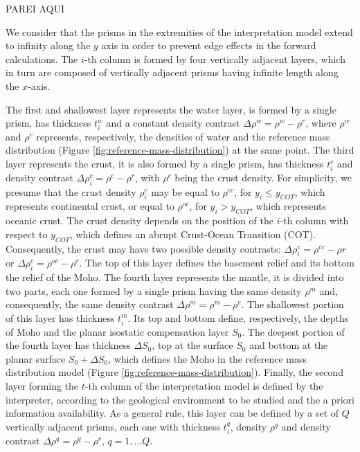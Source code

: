 \documentclass[manuscript]{geophysics}
\begin{document}
PAREI AQUI

We consider that the prisms in the 
extremities of the interpretation model extend to infinity along the $y$ axis 
in order to prevent edge effects in the forward calculations. 
The $i$-th column is formed by four vertically adjacent 
layers, which in turn are composed of vertically adjacent prisms having infinite 
length along the $x$-axis. 

The first and shallowest layer represents the water layer, 
is formed by a single prism, has thickness $t^{w}_{i}$ and a constant density contrast 
$\Delta \rho^{w} = \rho^{w} - \rho^{r}$, where $\rho^{w}$ and $\rho^{r}$ 
represents, respectively, the densities of water and the reference mass 
distribution (Figure \ref{fig:reference-mass-distribution}) at the same point.
The third layer represents the crust, it is also formed by a single prism,
has thickness $t^{c}_{i}$ and density contrast 
$\Delta \rho^{c}_{i} = \rho^{c} - \rho^{r}$, 
with $\rho^{c}$ being the crust density. For simplicity, we presume that the crust
density $\rho^{c}_{i}$ may be equal to $\rho^{cc}$, for $y_{i} \le y_{COT}$, which
represents continental crust,
or equal to $\rho^{oc}$, for $y_{i} > y_{COT}$, which represents oceanic crust.
The crust density depends on the position of the $i$-th column with respect to
$y_{COT}$, which defines an abrupt Crust-Ocean Transition (COT). Consequently, the
crust may have two possible density contrasts: 
$\Delta \rho^{c}_{i} = \rho^{cc} - \rho{r}$ or 
$\Delta \rho^{c}_{i} = \rho^{oc} - \rho^{r}$. The top of this layer defines the 
basement relief and its bottom the relief of the Moho. The fourth layer represents the
mantle, it is divided into two parts, each one formed by a single prism having the same
density $\rho^{m}$ and, consequently, the same density contrast 
$\Delta \rho^{m} = \rho^{m} - \rho^{r}$. The shallowest
portion of this layer has thickness $t^{m}_{i}$. Its top and bottom define,
respectively, the depths of Moho and the planar isostatic compensation layer $S_{0}$.
The deepest portion of the fourth layer has thickness $\Delta S_{0}$, top at the
surface $S_{0}$ and bottom at the planar surface 
$S_{0} + \Delta S_{0}$, which defines the Moho in the reference mass distribution model 
(Figure \ref{fig:reference-mass-distribution}). Finally, the second layer forming the
$t$-th column of the interpretation model is defined by the interpreter, according to
the geological environment to be studied and the a priori information availability. 
As a general rule, this layer can be defined by a set of $Q$ vertically adjacent
prisms, each one with thickness $t^{q}_{i}$, density $\rho^{q}$ and density contrast
$\Delta \rho^{q} = \rho^{q} - \rho^{r}$, $q = 1, \dots Q$.
\end{document}
